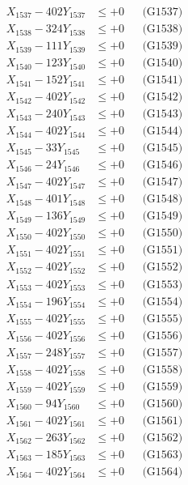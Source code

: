 \documentclass[a4paper,10pt]{article}
\begin{document}
{\begin{align}
X_{1537} - 402Y_{1537} &\leq +0 && \text{(G1537)} \\
X_{1538} - 324Y_{1538} &\leq +0 && \text{(G1538)} \\
X_{1539} - 111Y_{1539} &\leq +0 && \text{(G1539)} \\
X_{1540} - 123Y_{1540} &\leq +0 && \text{(G1540)} \\
\allowbreak
X_{1541} - 152Y_{1541} &\leq +0 && \text{(G1541)} \\
X_{1542} - 402Y_{1542} &\leq +0 && \text{(G1542)} \\
X_{1543} - 240Y_{1543} &\leq +0 && \text{(G1543)} \\
X_{1544} - 402Y_{1544} &\leq +0 && \text{(G1544)} \\
X_{1545} - 33Y_{1545} &\leq +0 && \text{(G1545)} \\
X_{1546} - 24Y_{1546} &\leq +0 && \text{(G1546)} \\
X_{1547} - 402Y_{1547} &\leq +0 && \text{(G1547)} \\
X_{1548} - 401Y_{1548} &\leq +0 && \text{(G1548)} \\
X_{1549} - 136Y_{1549} &\leq +0 && \text{(G1549)} \\
X_{1550} - 402Y_{1550} &\leq +0 && \text{(G1550)} \\
\allowbreak
X_{1551} - 402Y_{1551} &\leq +0 && \text{(G1551)} \\
X_{1552} - 402Y_{1552} &\leq +0 && \text{(G1552)} \\
X_{1553} - 402Y_{1553} &\leq +0 && \text{(G1553)} \\
X_{1554} - 196Y_{1554} &\leq +0 && \text{(G1554)} \\
X_{1555} - 402Y_{1555} &\leq +0 && \text{(G1555)} \\
X_{1556} - 402Y_{1556} &\leq +0 && \text{(G1556)} \\
X_{1557} - 248Y_{1557} &\leq +0 && \text{(G1557)} \\
X_{1558} - 402Y_{1558} &\leq +0 && \text{(G1558)} \\
X_{1559} - 402Y_{1559} &\leq +0 && \text{(G1559)} \\
X_{1560} - 94Y_{1560} &\leq +0 && \text{(G1560)} \\
\allowbreak
X_{1561} - 402Y_{1561} &\leq +0 && \text{(G1561)} \\
X_{1562} - 263Y_{1562} &\leq +0 && \text{(G1562)} \\
X_{1563} - 185Y_{1563} &\leq +0 && \text{(G1563)} \\
X_{1564} - 402Y_{1564} &\leq +0 && \text{(G1564)} \\

\end{align}}
\end{document}

